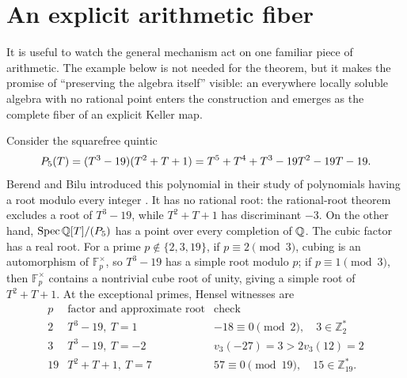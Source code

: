 \section{An explicit arithmetic fiber}\label{sec:example}



It is useful to watch the general mechanism act on one familiar piece of
arithmetic.  The example below is not needed for the theorem, but it makes
the promise of ``preserving the algebra itself'' visible: an everywhere
locally soluble algebra with no rational point enters the construction and
emerges as the complete fiber of an explicit Keller map.

Consider the squarefree quintic
\[
 P_5(T)=(T^{3} - 19)(T^{2} + T + 1)
 =T^{5} + T^{4} + T^{3} - 19T^{2} - 19T - 19.
\]
Berend and Bilu introduced this polynomial in their study of polynomials
having a root modulo every integer \cite{BerendBilu}.
It has no rational root: the rational-root theorem excludes a root of
\(T^3-19\), while \(T^2+T+1\) has discriminant \(-3\).  On the other hand,
\(\operatorname{Spec}\mathbb Q[T]/(P_5)\) has a point over every completion of \(\mathbb Q\).  The cubic
factor has a real root.  For a prime
\(p\notin\{2,3,19\}\), if \(p\equiv2\pmod3\), cubing is an automorphism of
\(\mathbb F_p^\times\), so \(T^3-19\) has a simple root modulo \(p\); if
\(p\equiv1\pmod3\), then \(\mathbb F_p^\times\) contains a nontrivial cube
root of unity, giving a simple root of \(T^2+T+1\).  At the exceptional
primes, Hensel witnesses are
\[
\begin{array}{c|c|c}
p&\text{factor and approximate root}&\text{check}\\ \hline
2&T^3-19,\ T=1&-18\equiv0\pmod2,\quad 3\in\mathbb Z_2^*\\
3&T^3-19,\ T=-2&v_3(-27)=3>2v_3(12)=2\\
19&T^2+T+1,\ T=7&57\equiv0\pmod{19},\quad15\in\mathbb Z_{19}^*.
\end{array}
\]


